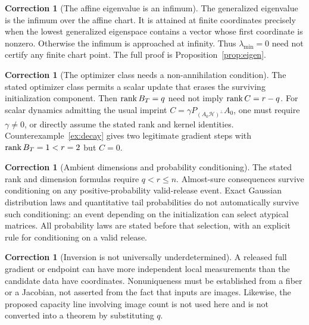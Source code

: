 \documentclass[11pt,a4paper]{article}
\theoremstyle{definition}
\theoremstyle{definition}
\newtheorem{correction}[theorem]{Correction}
\theoremstyle{remark}\newtheorem{remark}[theorem]{Remark}
\newcommand{\HH}{\mathcal H}\newcommand{\XX}{\mathcal X}\newcommand{\col}{\operatorname{col}}
\begin{document}
\begin{correction}[The affine eigenvalue is an infimum]
The generalized eigenvalue is the infimum over the affine chart. It is attained at finite coordinates precisely when the lowest generalized eigenspace contains a vector whose first coordinate is nonzero. Otherwise the infimum is approached at infinity. Thus $\lambda_{\min}=0$ need not certify any finite chart point. The full proof is Proposition~\ref{prop:eigen}.
\end{correction}

\begin{correction}[The optimizer class needs a non-annihilation condition]
The stated optimizer class permits a scalar update that erases the surviving initialization component. Then $\operatorname{rank} B_T=q$ need not imply $\operatorname{rank} C=r-q$. For scalar dynamics admitting the usual imprint $C=\gamma P_{(A_0\HH)^\perp}A_0$, one must require $\gamma\ne0$, or directly assume the stated rank and kernel identities. Counterexample~\ref{ex:decay} gives two legitimate gradient steps with $\operatorname{rank} B_T=1<r=2$ but $C=0$.
\end{correction}

\begin{correction}[Ambient dimensions and probability conditioning]
The stated rank and dimension formulas require $q<r\le n$. Almost-sure consequences survive conditioning on any positive-probability valid-release event. Exact Gaussian distribution laws and quantitative tail probabilities do not automatically survive such conditioning: an event depending on the initialization can select atypical matrices. All probability laws are stated before that selection, with an explicit rule for conditioning on a valid release.
\end{correction}

\begin{correction}[Inversion is not universally underdetermined]
A released full gradient or endpoint can have more independent local measurements than the candidate data have coordinates. Nonuniqueness must be established from a fiber or a Jacobian, not asserted from the fact that inputs are images. Likewise, the proposed capacity line involving image count is not used here and is not converted into a theorem by substituting $q$.
\end{correction}
\end{document}
